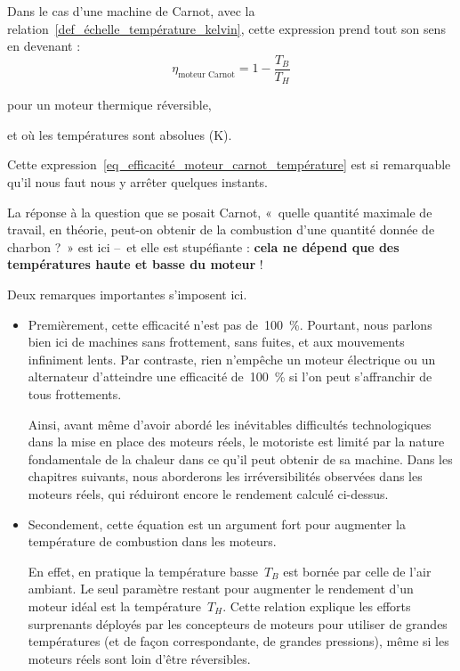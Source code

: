 		Dans le cas d’une machine de Carnot, avec la relation~\ref{def_échelle_température_kelvin}, cette expression prend tout son sens en devenant :
		\begin{equation}
			\eta_\text{moteur Carnot} = 1 - \frac{T_B}{T_H}
			\label{eq_efficacité_moteur_carnot_température}
		\end{equation}
		\begin{equationterms}
			\item pour un moteur thermique réversible,
			\item et où les températures sont absolues (\si{\kelvin}).
		\end{equationterms}

		Cette expression~\ref{eq_efficacité_moteur_carnot_température} est si remarquable qu’il nous faut nous y arrêter quelques instants.

		La réponse à la question que se posait Carnot, «~quelle quantité maximale de travail, en théorie, peut-on obtenir de la combustion d’une quantité donnée de charbon ?~» est ici --\ et elle est stupéfiante : \textbf{cela ne dépend que des températures haute et basse du moteur} !
		

		Deux remarques importantes s’imposent ici.

		\begin{itemize}
			\item Premièrement, cette efficacité n’est pas de~\SI{100}{\percent}. Pourtant, nous parlons bien ici de machines sans frottement, sans fuites, et aux mouvements infiniment lents. Par contraste, rien n’empêche un moteur électrique ou un alternateur d’atteindre une efficacité de~\SI{100}{\percent} si l’on peut s’affranchir de tous frottements.

			Ainsi, avant même d’avoir abordé les inévitables difficultés technologiques dans la mise en place des moteurs réels, le motoriste est limité par la nature fondamentale de la chaleur dans ce qu’il peut obtenir de sa machine. Dans les chapitres suivants, nous aborderons les irréversibilités observées dans les moteurs réels, qui réduiront encore le rendement calculé ci-dessus.

			\item Secondement, cette équation est un argument fort pour augmenter la température de combustion dans les moteurs.

			En effet, en pratique la température basse~$T_B$ est bornée par celle de l’air ambiant. Le seul paramètre restant pour augmenter le rendement d’un moteur idéal est la température~$T_H$. Cette relation explique les efforts surprenants déployés par les concepteurs de moteurs pour utiliser de grandes températures (et de façon correspondante, de grandes pressions), même si les moteurs réels sont loin d’être réversibles.

		\end{itemize}

